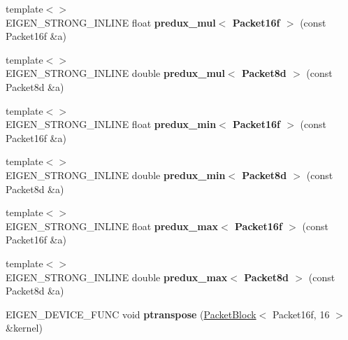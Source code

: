 \begin{DoxyCompactItemize}
{\footnotesize template$<$$>$ }\\E\+I\+G\+E\+N\+\_\+\+S\+T\+R\+O\+N\+G\+\_\+\+I\+N\+L\+I\+NE float {\bfseries predux\+\_\+mul$<$ Packet16f $>$} (const Packet16f \&a)
\item 
\mbox{\label{namespace_eigen_1_1internal_aacecd61343765583cd7154eef63b871f}} 
{\footnotesize template$<$$>$ }\\E\+I\+G\+E\+N\+\_\+\+S\+T\+R\+O\+N\+G\+\_\+\+I\+N\+L\+I\+NE double {\bfseries predux\+\_\+mul$<$ Packet8d $>$} (const Packet8d \&a)
\item 
\mbox{\label{namespace_eigen_1_1internal_ad57dbb23cf8b01f9bf6775296d50ae66}} 
{\footnotesize template$<$$>$ }\\E\+I\+G\+E\+N\+\_\+\+S\+T\+R\+O\+N\+G\+\_\+\+I\+N\+L\+I\+NE float {\bfseries predux\+\_\+min$<$ Packet16f $>$} (const Packet16f \&a)
\item 
\mbox{\label{namespace_eigen_1_1internal_a9177de25894c59a08af1911b72e84ba3}} 
{\footnotesize template$<$$>$ }\\E\+I\+G\+E\+N\+\_\+\+S\+T\+R\+O\+N\+G\+\_\+\+I\+N\+L\+I\+NE double {\bfseries predux\+\_\+min$<$ Packet8d $>$} (const Packet8d \&a)
\item 
\mbox{\label{namespace_eigen_1_1internal_a2f594e100840510ecff9509db7639f6e}} 
{\footnotesize template$<$$>$ }\\E\+I\+G\+E\+N\+\_\+\+S\+T\+R\+O\+N\+G\+\_\+\+I\+N\+L\+I\+NE float {\bfseries predux\+\_\+max$<$ Packet16f $>$} (const Packet16f \&a)
\item 
\mbox{\label{namespace_eigen_1_1internal_a8bdf55c06e26d3bdb9d15c84505e2c42}} 
{\footnotesize template$<$$>$ }\\E\+I\+G\+E\+N\+\_\+\+S\+T\+R\+O\+N\+G\+\_\+\+I\+N\+L\+I\+NE double {\bfseries predux\+\_\+max$<$ Packet8d $>$} (const Packet8d \&a)
\item 
\mbox{\label{namespace_eigen_1_1internal_ac5b69d1f125886b8ed3fca1602bd3b4c}} 
E\+I\+G\+E\+N\+\_\+\+D\+E\+V\+I\+C\+E\+\_\+\+F\+U\+NC void {\bfseries ptranspose} (\hyperlink{struct_eigen_1_1internal_1_1_packet_block}{Packet\+Block}$<$ Packet16f, 16 $>$ \&kernel)

\end{DoxyCompactItemize}
